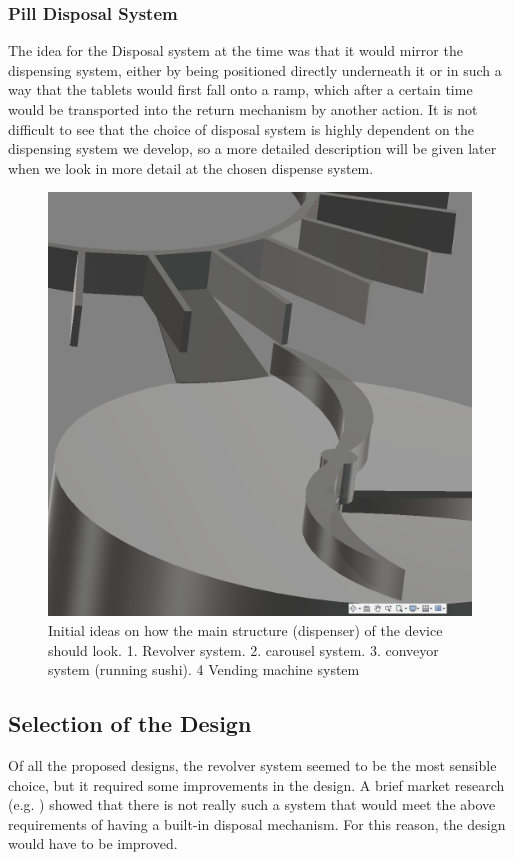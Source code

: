 \subsubsection{Pill Disposal System}
The idea for the Disposal system at the time was that it would mirror the dispensing system, either by being positioned directly underneath it or in such a way that the tablets would first fall onto a ramp, which after a certain time would be transported into the return mechanism by another action. It is not difficult to see that the choice of disposal system is highly dependent on the dispensing system we develop, so a more detailed description will be given later when we look in more detail at the chosen dispense system.
\begin{figure}[h]
	\centering
	\includegraphics[width=0.7\linewidth]{Figures/Screenshot_1.png} 
	\caption[Early drafts]{Initial ideas on how the main structure (dispenser) of the device should look. 1. Revolver system. 2. carousel system. 3. conveyor system (running sushi). 4 Vending machine system}
	\label{fig:designs}
\end{figure}
\newpage
\subsection{Selection of the Design}
Of all the proposed designs, the revolver system seemed to be the most sensible choice, but it required some improvements in the design. A brief market research (e.g. \cite{LiveFinePillDispenser} \cite{zoksi_pill_organizer}) showed that there is not really such a system that would meet the above requirements of having a built-in disposal mechanism. For this reason, the design would have to be improved.
